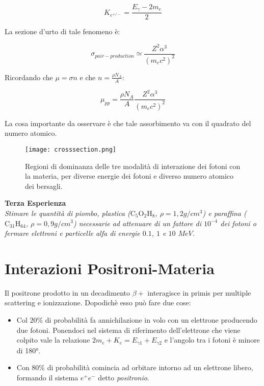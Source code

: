 \documentclass [a4paper, twoside] {book}
\begin{document}
\begin{equation}
K_{e^{+/-}}=\frac{E_{\gamma}-2m_e}{2}
\end{equation}

La sezione d'urto di tale fenomeno è:

\begin{equation}
\sigma_{pair-production}\simeq\frac{Z^2\alpha^3}{(m_ec^2)^2}
\end{equation}

Ricordando che $\mu=\sigma n$ e che $n=\frac{\rho N_A}{A}$:

\begin{equation}
\mu_{pp}=\frac{\rho N_A}{A}\frac{Z^2\alpha^3}{(m_ec^2)^2}
\end{equation}

La cosa importante da osservare è che tale assorbimento va con il quadrato del numero atomico.\\

\begin{figure} []
\centering
		\texttt{[image: crosssection.png]}
		\caption{Regioni di dominanza delle tre modalità di interazione dei fotoni con la materia, per diverse energie dei fotoni e diverso numero atomico dei bersagli.}
         \label{crosssection}
\end{figure}



\textbf{Terza Esperienza}\\

\emph{Stimare le quantità di piombo, plastica ($\text{C}_5\text{O}_2\text{H}_8$, $\rho=1,2 g/cm^3$) e paraffina ($\text{C}_{31}\text{H}_{64}$, $\rho=0,9 g/cm^3$) necessarie ad attenuare di un fattore di $10^{-4}$ dei fotoni o fermare elettroni e particelle alfa di energie $0.1$, $1$ e $10$ $MeV$.}

\section{Interazioni Positroni-Materia}

Il positrone prodotto in un decadimento $\beta+$ interagisce in primis per multiple scattering e ionizzazione. Dopodichè esso può fare due cose:

\begin{itemize}
\item Col $20\%$ di probabilità fa annichilazione in volo con un elettrone producendo due fotoni. Ponendoci nel sistema di riferimento dell'elettrone che viene colpito vale la relazione $2m_e+K_e=E_{\gamma1}+E_{\gamma2}$ e l'angolo tra i fotoni è minore di \ang{180}.
\item Con 80\% di probabilità comincia ad orbitare intorno ad un elettrone libero, formando il sistema $e^+e^-$ detto \emph{positronio}.
\end{itemize}
\end{document}
